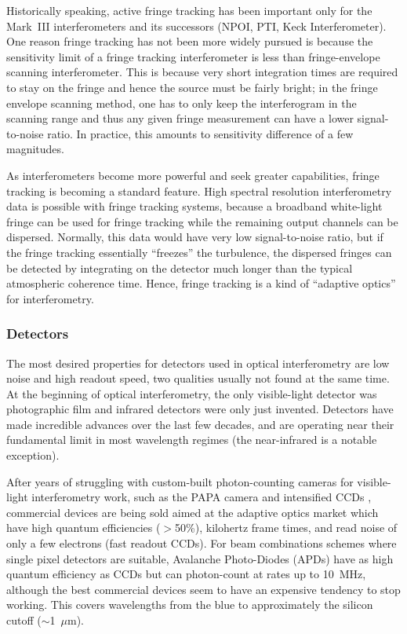 \documentclass[12pt]{iopart}
\begin{document}
Historically speaking, active fringe tracking has been important only
for the Mark~III interferometers and its successors (NPOI, PTI, 
Keck Interferometer). One reason fringe tracking has not been more widely
pursued is because the sensitivity limit of a fringe
tracking interferometer is less than fringe-envelope scanning interferometer.
This is because very short integration times are required to stay on the
fringe and hence the source must be fairly bright; in the fringe envelope
scanning method, one has to only keep the interferogram in the scanning range and
thus any given fringe measurement can have a lower signal-to-noise ratio.
In practice, this amounts to sensitivity difference of a 
few magnitudes.

As interferometers become more powerful and seek greater capabilities,
fringe tracking is becoming a standard feature.  High spectral
resolution interferometry data is possible with fringe tracking
systems, because a broadband white-light fringe can be used for fringe
tracking while the remaining output channels can be dispersed.
Normally, this data would have very low signal-to-noise ratio, but if
the fringe tracking essentially ``freezes'' the turbulence, the
dispersed fringes can be detected by integrating on the detector much
longer than the typical atmospheric coherence time.  Hence, fringe
tracking is a kind of ``adaptive optics'' for interferometry.

\subsubsection{Detectors}
\label{detectors}
The most desired properties for detectors used in optical interferometry
are low noise and high readout speed, two qualities usually not found
at the same time.  At the beginning of optical interferometry, the
only visible-light detector was photographic film and infrared detectors
were only just invented.  Detectors have made incredible advances over
the last few decades, and are operating near their fundamental limit
in most wavelength regimes (the near-infrared is a notable exception).

After years of struggling with custom-built photon-counting cameras
for visible-light interferometry work, such as the PAPA camera
\citep{papa1985,lawson1994} and intensified CCDs
\citep[e.g.,][]{blazit1987,foy1988}, commercial devices are being sold
aimed at the adaptive optics market which have high quantum
efficiencies ($>$50\%), kilohertz frame times, and read noise of only
a few electrons (fast readout CCDs).  For beam combinations schemes
where single pixel detectors are suitable, Avalanche Photo-Diodes
(APDs) have as high quantum efficiency as CCDs but can photon-count at
rates up to 10~MHz, although the best commercial devices seem to have
an expensive tendency to stop working.  This covers wavelengths from
the blue to approximately the silicon cutoff ($\sim$1~$\mu$m).
\end{document}
